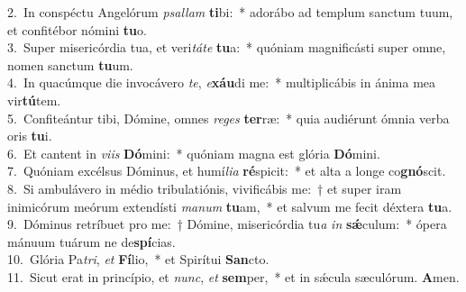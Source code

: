 {2.~}In conspéctu Angelórum \textit{psal}\textit{lam} \textbf{ti}bi:~* adorábo ad templum sanctum tuum, et confitébor nómini \textbf{tu}o.\\
{3.~}Super misericórdia tua, et veri\textit{tá}\textit{te} \textbf{tu}a:~* quóniam magnificásti super omne, nomen sanctum \textbf{tu}um.\\
{4.~}In quacúmque die invocávero \textit{te}, \textit{e}\textbf{xáu}di me:~* multiplicábis in ánima mea vir\textbf{tú}tem.\\
{5.~}Confiteántur tibi, Dómine, omnes \textit{re}\textit{ges} \textbf{ter}ræ:~* quia audiérunt ómnia verba oris \textbf{tu}i.\\
{6.~}Et cantent in \textit{vi}\textit{is} \textbf{Dó}mini:~* quóniam magna est glória \textbf{Dó}mini.\\
{7.~}Quóniam excélsus Dóminus, et humí\textit{li}\textit{a} \textbf{ré}spicit:~* et alta a longe co\textbf{gnó}scit.\\
{8.~}Si ambulávero in médio tribulatiónis, vivificábis me:~† et super iram inimicórum meórum extendísti \textit{ma}\textit{num} \textbf{tu}am,~* et salvum me fecit déxtera \textbf{tu}a.\\
{9.~}Dóminus retríbuet pro me:~† Dómine, misericórdia tu\textit{a} \textit{in} \textbf{sǽ}culum:~* ópera mánuum tuárum ne de\textbf{spí}cias.\\
{10.~}Glória Pa\textit{tri}, \textit{et} \textbf{Fí}lio,~* et Spirítui \textbf{San}cto.\\
{11.~}Sicut erat in princípio, et \textit{nunc}, \textit{et} \textbf{sem}per,~* et in sǽcula sæculórum. \textbf{A}men.\\
